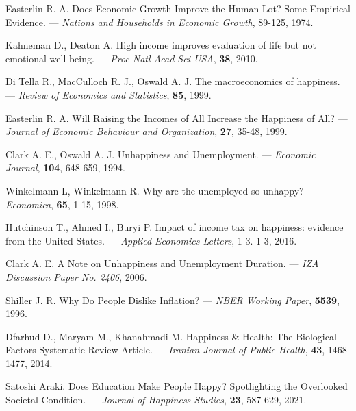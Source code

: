 \documentclass[russian]{vegareport}
\begin{document}
    \begin{thebibliography}{100}
            \bibitem{} \label{Easterlin}
            Easterlin R. A.
            Does Economic Growth Improve the Human Lot? Some Empirical Evidence.
            --- \textit{Nations and Households in Economic Growth}, 
            89-125, 1974.

            \bibitem{} \label{KahnemanDeaton}
            Kahneman D., Deaton A. 
            High income improves evaluation of life but not emotional well-being. 
            --- \textit{Proc Natl Acad Sci USA},
            \textbf{38}, 2010.

            \bibitem{} \label{DiTella}
            Di Tella R., MacCulloch R. J., Oswald A. J.
            The macroeconomics of happiness. 
           --- \textit{Review of Economics and Statistics}, 
            \textbf{85}, 1999. 

            \bibitem{} \label{Easterlin2}
            Easterlin R. A.
            Will Raising the Incomes of All Increase the Happiness of All?
            --- \textit{Journal of Economic Behaviour and Organization},
            \textbf{27}, 35-48, 1999. 

            \bibitem{} \label{Clark}
            Clark A. E., Oswald A. J.
            Unhappiness and Unemployment.
            --- \textit{Economic Journal}, 
            \textbf{104}, 648-659, 1994. 

            \bibitem{} \label{Winkelmann}
            Winkelmann L, Winkelmann R.
            Why are the unemployed so unhappy?
            --- \textit{Economica}, 
            \textbf{65}, 1-15, 1998. 

            \bibitem{} \label{tax}
            Hutchinson T., Ahmed I., Buryi P.
            Impact of income tax on happiness: evidence from the United States. 
            --- \textit{Applied Economics Letters}, 1-3.
            1-3, 2016.

            \bibitem{} \label{Clarkunemp}
            Clark A. E.
            A Note on Unhappiness and Unemployment Duration.
            --- \textit{IZA Discussion Paper No. 2406}, 
            2006. 
            
            \bibitem{} \label{Inflation}
            Shiller J. R.
            Why Do People Dislike Inflation?
            --- \textit{NBER Working Paper}, 
            \textbf{5539}, 1996. 

            \bibitem{} \label{medicine}
            Dfarhud D., Maryam M., Khanahmadi M. 
            Happiness & Health: The Biological Factors-Systematic Review Article.
            --- \textit{Iranian Journal of Public Health}, 
            \textbf{43}, 1468-1477, 2014. 

            \bibitem{} \label{Education}
            Satoshi Araki.
            Does Education Make People Happy? Spotlighting the Overlooked Societal Condition.
            --- \textit{Journal of Happiness Studies}, 
            \textbf{23}, 587-629, 2021. 
        \end{thebibliography}
\end{document}
